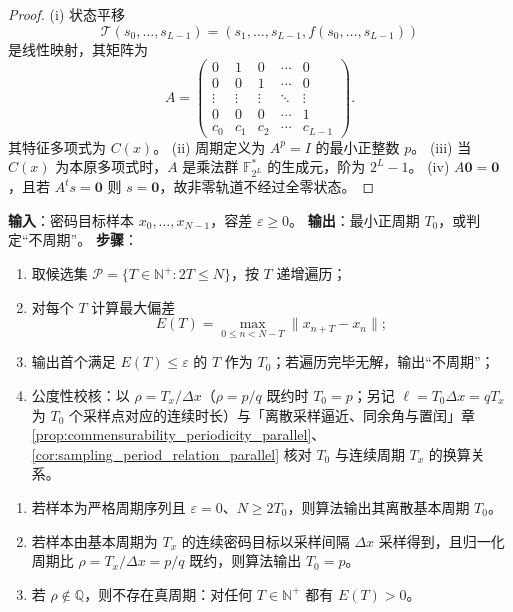 \begin{proof}
(i) 状态平移
\[
\mathcal T(s_0,\dots,s_{L-1})=(s_1,\dots,s_{L-1},f(s_0,\dots,s_{L-1}))
\]
是线性映射，其矩阵为
\[
A=\begin{pmatrix}
0&1&0&\cdots&0\\
0&0&1&\cdots&0\\
\vdots&\vdots&\vdots&\ddots&\vdots\\
0&0&0&\cdots&1\\
c_0&c_1&c_2&\cdots&c_{L-1}
\end{pmatrix}.
\]
其特征多项式为 \(C(x)\)。
(ii) 周期定义为 \(A^p=I\) 的最小正整数 \(p\)。
(iii) 当 \(C(x)\) 为本原多项式时，\(A\) 是乘法群 \(\mathbb F_{2^L}^*\) 的生成元，阶为 \(2^L-1\)。
(iv) \(A\mathbf 0=\mathbf 0\)，且若 \(A^t s=\mathbf 0\) 则 \(s=\mathbf 0\)，故非零轨道不经过全零状态。
\end{proof}

\begin{definition}[密码最小正周期算法]\label{def:crypto_minimal_period_algorithm}
\textbf{输入}：密码目标样本 \(x_0,\dots,x_{N-1}\)，容差 \(\varepsilon\ge0\)。
\textbf{输出}：最小正周期 \(T_0\)，或判定“不周期”。
\textbf{步骤}：
\begin{enumerate}[label=(\arabic*)]
    \item 取候选集 \(\mathcal P=\{T\in\mathbb N^+:2T\le N\}\)，按 \(T\) 递增遍历；
    \item 对每个 \(T\) 计算最大偏差
    \[
    E(T)=\max_{0\le n<N-T}\|x_{n+T}-x_n\|;
    \]
    \item 输出首个满足 \(E(T)\le\varepsilon\) 的 \(T\) 作为 \(T_0\)；若遍历完毕无解，输出“不周期”；
    \item 公度性校核：以 \(\rho=T_x/\Delta x\)（\(\rho=p/q\) 既约时 \(T_0=p\)；另记 \(\ell=T_0\Delta x=qT_x\) 为 \(T_0\) 个采样点对应的连续时长）与「离散采样逼近、同余角与置闰」章 \cref{prop:commensurability_periodicity_parallel}、\cref{cor:sampling_period_relation_parallel} 核对 \(T_0\) 与连续周期 \(T_x\) 的换算关系。
\end{enumerate}
\end{definition}

\begin{theorem}[密码最小正周期算法的正确性]\label{thm:crypto_minimal_period_correctness}
\begin{enumerate}[label=(\roman*)]
    \item 若样本为严格周期序列且 \(\varepsilon=0\)、\(N\ge2T_0\)，则算法输出其离散基本周期 \(T_0\)。
    \item 若样本由基本周期为 \(T_x\) 的连续密码目标以采样间隔 \(\Delta x\) 采样得到，且归一化周期比 \(\rho=T_x/\Delta x=p/q\) 既约，则算法输出 \(T_0=p\)。
    \item 若 \(\rho\notin\mathbb Q\)，则不存在真周期：对任何 \(T\in\mathbb N^+\) 都有 \(E(T)>0\)。
\end{enumerate}
\end{theorem}

